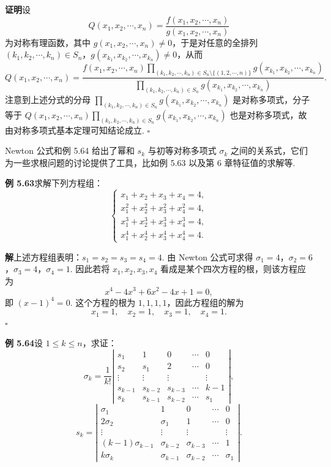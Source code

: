 \documentclass[UTF8, 12pt, fontset=fandol, oneside]{ctexart}
\begin{document}
\noindent\textbf{证明}\quad 设
\[
Q(x_1,x_2,\cdots,x_n)=\frac{f(x_1,x_2,\cdots,x_n)}{g(x_1,x_2,\cdots,x_n)}
\]
为对称有理函数，其中 $g(x_1,x_2,\cdots,x_n)\ne0$，于是对任意的全排列 $(k_1,k_2,\cdots,k_n)\in S_n$，$g(x_{k_1},x_{k_2},\cdots,x_{k_n})\ne0$，从而
\[
Q(x_1,x_2,\cdots,x_n)=
\frac{
f(x_1,x_2,\cdots,x_n)\displaystyle\prod_{(k_1,k_2,\cdots,k_n)\in S_n\setminus\{(1,2,\cdots,n)\}}g(x_{k_1},x_{k_2},\cdots,x_{k_n})
}{
\displaystyle\prod_{(k_1,k_2,\cdots,k_n)\in S_n}g(x_{k_1},x_{k_2},\cdots,x_{k_n})
}.
\]
注意到上述分式的分母 $\displaystyle\prod_{(k_1,k_2,\cdots,k_n)\in S_n}g(x_{k_1},x_{k_2},\cdots,x_{k_n})$ 是对称多项式，分子等于 $Q(x_1,x_2,\cdots,x_n)\displaystyle\prod_{(k_1,k_2,\cdots,k_n)\in S_n}g(x_{k_1},x_{k_2},\cdots,x_{k_n})$ 也是对称多项式，故由对称多项式基本定理可知结论成立. \hfill $\square$

Newton 公式和例 5.64 给出了幂和 $s_k$ 与初等对称多项式 $\sigma_k$ 之间的关系式，它们为一些求根问题的讨论提供了工具，比如例 5.63 以及第 6 章特征值的求解等.

\noindent\textbf{例 5.63}\quad 求解下列方程组：
\[
\left\{
\begin{array}{l}
x_1+x_2+x_3+x_4=4,\\
x_1^2+x_2^2+x_3^2+x_4^2=4,\\
x_1^3+x_2^3+x_3^3+x_4^3=4,\\
x_1^4+x_2^4+x_3^4+x_4^4=4.
\end{array}
\right.
\]

\noindent\textbf{解}\quad 上述方程组表明：$s_1=s_2=s_3=s_4=4$. 由 Newton 公式可求得 $\sigma_1=4$，$\sigma_2=6$，$\sigma_3=4$，$\sigma_4=1$. 因此若将 $x_1,x_2,x_3,x_4$ 看成是某个四次方程的根，则该方程应为
\[
x^4-4x^3+6x^2-4x+1=0,
\]
即 $(x-1)^4=0$. 这个方程的根为 $1,1,1,1$，因此方程组的解为
\[
x_1=1,\quad x_2=1,\quad x_3=1,\quad x_4=1.
\]
\hfill $\square$

\noindent\textbf{例 5.64}\quad 设 $1\le k\le n$，求证：
\[
\sigma_k=\frac1{k!}
\left|\begin{array}{ccccc}
s_1 & 1 & 0 & \cdots & 0\\
s_2 & s_1 & 2 & \cdots & 0\\
\vdots & \vdots & \vdots &        & \vdots\\
s_{k-1} & s_{k-2} & s_{k-3} & \cdots & k-1\\
s_k & s_{k-1} & s_{k-2} & \cdots & s_1
\end{array}\right|,
\]
\[
s_k=
\left|\begin{array}{ccccc}
\sigma_1 & 1 & 0 & \cdots & 0\\
2\sigma_2 & \sigma_1 & 1 & \cdots & 0\\
\vdots & \vdots & \vdots &        & \vdots\\
(k-1)\sigma_{k-1} & \sigma_{k-2} & \sigma_{k-3} & \cdots & 1\\
k\sigma_k & \sigma_{k-1} & \sigma_{k-2} & \cdots & \sigma_1
\end{array}\right|.
\]
\end{document}
